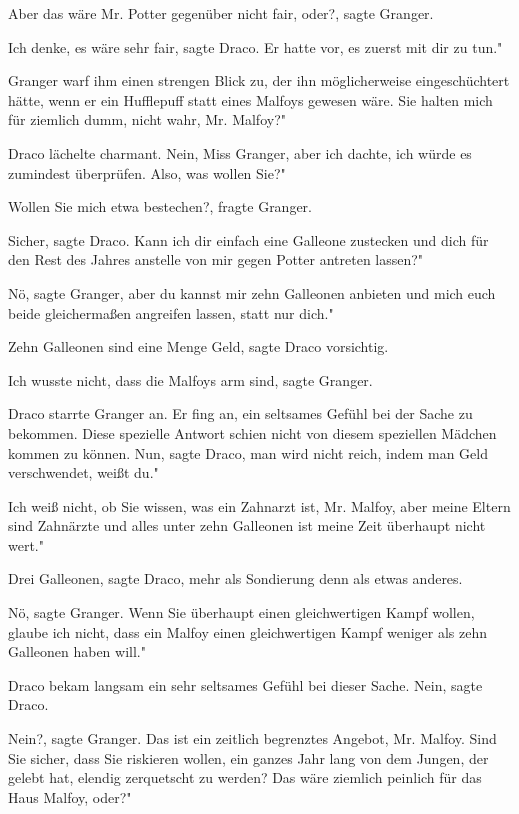\glqq{}Aber das wäre Mr. Potter gegenüber nicht fair, oder?\grqq{}, sagte
Granger.

\glqq{}Ich denke, es wäre sehr fair\grqq{}, sagte Draco. \glqq{}Er hatte vor, es
zuerst mit dir zu tun."

Granger warf ihm einen strengen Blick zu, der ihn möglicherweise eingeschüchtert
hätte, wenn er ein Hufflepuff statt eines Malfoys gewesen wäre. \glqq{}Sie halten
mich für ziemlich dumm, nicht wahr, Mr. Malfoy?"

Draco lächelte charmant. \glqq{}Nein, Miss Granger, aber ich dachte, ich würde es
zumindest überprüfen. Also, was wollen Sie?"

\glqq{}Wollen Sie mich etwa bestechen?\grqq{}, fragte Granger.

\glqq{}Sicher\grqq{}, sagte Draco. \glqq{}Kann ich dir einfach eine Galleone
zustecken und dich für den Rest des Jahres anstelle von mir gegen Potter
antreten lassen?"

\glqq{}Nö\grqq{}, sagte Granger, \glqq{}aber du kannst mir zehn Galleonen anbieten
und mich euch beide gleichermaßen angreifen lassen, statt nur dich."

\glqq{}Zehn Galleonen sind eine Menge Geld\grqq{}, sagte Draco vorsichtig.

\glqq{}Ich wusste nicht, dass die Malfoys arm sind\grqq{}, sagte Granger.

Draco starrte Granger an. Er fing an, ein seltsames Gefühl bei der Sache zu
bekommen. Diese spezielle Antwort schien nicht von diesem speziellen Mädchen
kommen zu können. \glqq{}Nun\grqq{}, sagte Draco, \glqq{}man wird nicht reich,
indem man Geld verschwendet, weißt du."

\glqq{}Ich weiß nicht, ob Sie wissen, was ein Zahnarzt ist, Mr. Malfoy, aber
meine Eltern sind Zahnärzte und alles unter zehn Galleonen ist meine Zeit
überhaupt nicht wert."

\glqq{}Drei Galleonen\grqq{}, sagte Draco, mehr als Sondierung denn als etwas
anderes.

\glqq{}Nö\grqq{}, sagte Granger. \glqq{}Wenn Sie überhaupt einen gleichwertigen
Kampf wollen, glaube ich nicht, dass ein Malfoy einen gleichwertigen Kampf
weniger als zehn Galleonen haben will."

Draco bekam langsam ein sehr seltsames Gefühl bei dieser Sache. \glqq{}
Nein\grqq{}, sagte Draco.

\glqq{}Nein?\grqq{}, sagte Granger. \glqq{}Das ist ein zeitlich begrenztes
Angebot, Mr. Malfoy. Sind Sie sicher, dass Sie riskieren wollen, ein ganzes Jahr
lang von dem Jungen, der gelebt hat, elendig zerquetscht zu werden? Das wäre
ziemlich peinlich für das Haus Malfoy, oder?"

